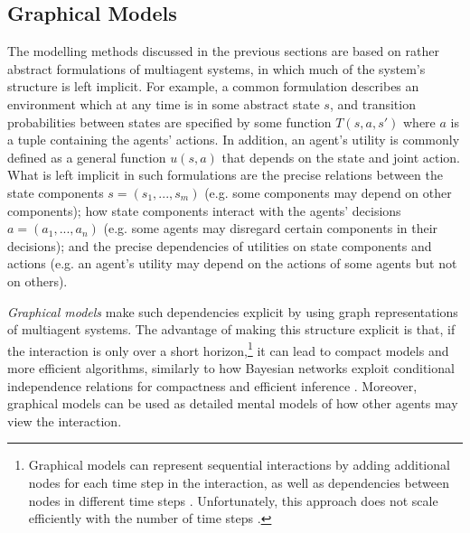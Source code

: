 \documentclass[final,1p,times,authoryear]{elsarticle}
\begin{document}
		\subsection{\bf Graphical Models} \label{sec:graphmod}

The modelling methods discussed in the previous sections are based on rather abstract formulations of multiagent systems, in which much of the system's structure is left implicit. For example, a common formulation describes an environment which at any time is in some abstract state $s$, and transition probabilities between states are specified by some function $T(s,a,s')$ where $a$ is a tuple containing the agents' actions. In addition, an agent's utility is commonly defined as a general function $u(s,a)$ that depends on the state and joint action. What is left implicit in such formulations are the precise relations between the state components $s = (s_1,...,s_m)$ (e.g. some components may depend on other components); how state components interact with the agents' decisions $a = (a_1,...,a_n)$ (e.g. some agents may disregard certain components in their decisions); and the precise dependencies of utilities on state components and actions (e.g. an agent's utility may depend on the actions of some agents but not on others).

\emph{Graphical models} make such dependencies explicit by using graph representations of multiagent systems. The advantage of making this structure explicit is that, if the interaction is only over a short horizon,\footnote{Graphical models can represent sequential interactions by adding additional nodes for each time step in the interaction, as well as dependencies between nodes in different time steps \citep{jn2011}. Unfortunately, this approach does not scale efficiently with the number of time steps \citep[e.g.][]{dzc2009,gp2003ws}.} it can lead to compact models and more efficient algorithms, similarly to how Bayesian networks exploit conditional independence relations for compactness and efficient inference \citep{kf2009,p1988}. Moreover, graphical models can be used as detailed mental models of how other agents may view the interaction.
\end{document}
